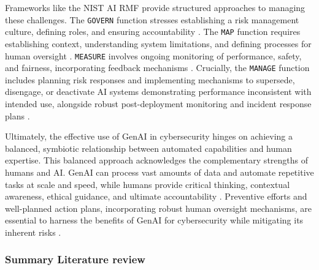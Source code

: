Frameworks like the NIST AI RMF provide structured approaches to managing these challenges. The \texttt{GOVERN} function stresses establishing a risk management culture, defining roles, and ensuring accountability \cite[p. 21-24]{tabassi_artificial_2023}. The \texttt{MAP} function requires establishing context, understanding system limitations, and defining processes for human oversight \cite[p. 24-28]{tabassi_artificial_2023}. \texttt{MEASURE} involves ongoing monitoring of performance, safety, and fairness, incorporating feedback mechanisms \cite[p. 28-31]{tabassi_artificial_2023}. Crucially, the \texttt{MANAGE} function includes planning risk responses and implementing mechanisms to supersede, disengage, or deactivate AI systems demonstrating performance inconsistent with intended use, alongside robust post-deployment monitoring and incident response plans \cite[p. 31-33]{tabassi_artificial_2023}.

Ultimately, the effective use of GenAI in cybersecurity hinges on achieving a balanced, symbiotic relationship between automated capabilities and human expertise. This balanced approach acknowledges the complementary strengths of humans and AI. GenAI can process vast amounts of data and automate repetitive tasks at scale and speed, while humans provide critical thinking, contextual awareness, ethical guidance, and ultimate accountability \cite{patel_generative_2025}. Preventive efforts and well-planned action plans, incorporating robust human oversight mechanisms, are essential to harness the benefits of GenAI for cybersecurity while mitigating its inherent risks \cite{patel_generative_2025}.



\subsubsection{Summary Literature review} %
\label{sec:Summary Literature review}

